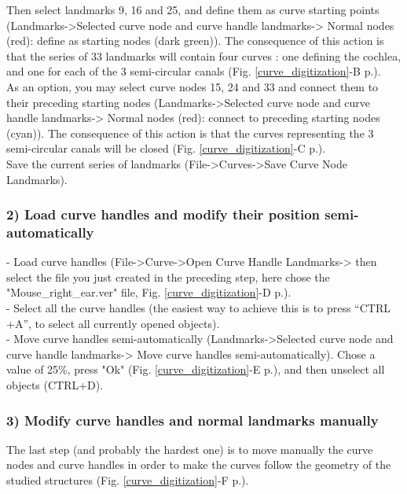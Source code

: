 \documentclass[12pt, a4paper]{book}
\begin{document}
Then select landmarks 9, 16 and 25, and define them as curve starting points (Landmarks->Selected curve node and curve handle landmarks-> Normal nodes (red): define as starting nodes (dark green)). The consequence of this action is that the series of 33 landmarks will contain four
curves : one defining the cochlea, and one for each of the 3 semi-circular canals (Fig. \ref{curve_digitization}-B p.\pageref{curve_digitization}).\\

As an option, you may select curve nodes 15, 24 and 33 and connect them to their preceding starting
nodes (Landmarks->Selected curve node and curve handle landmarks-> Normal nodes (red): connect
to preceding starting nodes (cyan)). The consequence of this action is that the curves representing
the 3 semi-circular canals will be closed (Fig. \ref{curve_digitization}-C p.\pageref{curve_digitization}).\\
Save the current series of landmarks (File->Curves->Save Curve Node Landmarks).

\subsubsection{2) Load curve handles and modify their position semi-automatically}
- Load curve handles (File->Curve->Open Curve Handle Landmarks-> then select the file you just created
in the preceding step, here chose the "Mouse\_right\_ear.ver" file, Fig. \ref{curve_digitization}-D p.\pageref{curve_digitization}).\\
- Select all the curve handles (the easiest way to achieve this is to press “CTRL +A”, to select all currently
opened objects).\\
- Move curve handles semi-automatically (Landmarks->Selected curve node and curve handle landmarks-> Move curve handles semi-automatically). Chose a value of 25\%, press "Ok" (Fig. \ref{curve_digitization}-E p.\pageref{curve_digitization}), and then unselect all objects (CTRL+D).\\

\subsubsection{3) Modify curve handles and normal landmarks manually}
The last step (and probably the hardest one) is to move manually the curve nodes and curve handles in order to make the curves follow the geometry of the studied structures (Fig. \ref{curve_digitization}-F p.\pageref{curve_digitization}).
\end{document}
